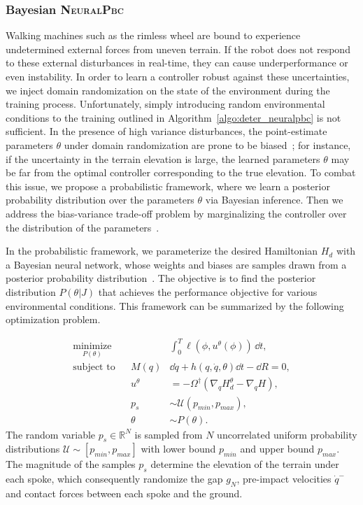 \subsubsection{Bayesian \textsc{NeuralPbc}}
\label{sssec:bayesian_inference}

Walking machines such as the rimless wheel are bound to experience undetermined
external forces from uneven terrain.
%
If the robot does not respond to these external disturbances in real-time, they
can cause underperformance or even instability.
%
In order to learn a controller robust against these uncertainties, we inject
domain randomization on the state of the environment during the training
process.
%
Unfortunately, simply introducing random environmental conditions to the
training outlined in Algorithm~\ref{algo:deter_neuralpbc} is not sufficient. 
%
In the presence of high variance disturbances, the point-estimate parameters
$\theta$ under domain randomization are prone to be
biased~\cite{ashenafi2022robustness};
%
for instance, if the uncertainty in the terrain elevation is large, the learned
parameters $\theta$ may be far from the optimal controller corresponding to
the true elevation.
%
To combat this issue, we propose a probabilistic framework, where we learn a
posterior probability distribution over the parameters $\theta$ via Bayesian
inference. 
%
Then we address the bias-variance trade-off problem by marginalizing the
controller over the distribution of the parameters~\cite{bishop2006pattern}.

In the probabilistic framework, we parameterize the desired Hamiltonian $H_d$
with a Bayesian neural network, whose weights and biases are samples drawn from
a posterior probability distribution~\cite{jospin2020hands}.
%
The objective is to find the posterior distribution $P(\theta |J)$ that achieves
the performance objective for various environmental conditions.
%
This framework can be summarized by the following optimization problem.

\begin{equation}
    \begin{aligned}
        \underset{P(\theta)}{\textrm{minimize}} 
        & & &\int_{0}^{T} \ell \left(\phi,u^{\theta}(\phi) \right) \, \dd t , \\
        \textrm{subject to}
        & & M(q) &\dd \dot{q} + h(q, \dot{q}, \theta)\dd t - \dd R  = 0,\\
        & & u^{\theta} &= -\Omega^{\dagger} (\nabla_q H_d^{\theta} - \nabla_q H), \\
        & & p_s &\sim \mathcal{U}(p_{min}, p_{max}), \\
        & & \theta &\sim P(\theta).
    \end{aligned}
    \label{eq:bayesian_hybrid_neuralpbc}
\end{equation}
\noindent The random variable $p_s \in \mathbb{R}^{N}$ is sampled from $N$
uncorrelated uniform probability distributions $\mathcal{U} \sim [p_{min}, p_{max}]$
with lower bound $p_{min}$ and upper bound $p_{max}$.
%
The magnitude of the samples $p_s$ determine the elevation of the terrain under
each spoke, which consequently randomize the gap $g_N$, pre-impact velocities
$\dot{q}^{-}$ and contact forces between each spoke and the ground.

